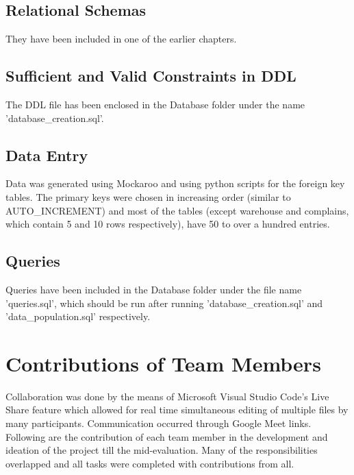 \documentclass[12pt]{report}
\begin{document}
	\section{Relational Schemas}
	They have been included in one of the earlier chapters.
	
	\section{Sufficient and Valid Constraints in DDL}
	The DDL file has been enclosed in the Database folder under the name 'database\_creation.sql'.

	\section{Data Entry}
	Data was generated using Mockaroo and using python scripts for the foreign key tables. The primary keys were chosen in increasing order (similar to AUTO\_INCREMENT) and most of the tables (except warehouse and complains, which contain 5 and 10 rows respectively), have 50 to over a hundred entries.

	\section{Queries}
	Queries have been included in the Database folder under the file name 'queries.sql', which should be run after running 'database\_creation.sql' and 'data\_population.sql' respectively.
	
\chapter{Contributions of Team Members}
Collaboration was done by the means of Microsoft Visual Studio Code's Live Share feature which allowed for real time simultaneous editing of multiple files by many participants. Communication occurred through Google Meet links. Following are the contribution of each team member in the development and ideation of the project till the mid-evaluation. Many of the responsibilities overlapped and all tasks were completed with contributions from all. 
\end{document}
